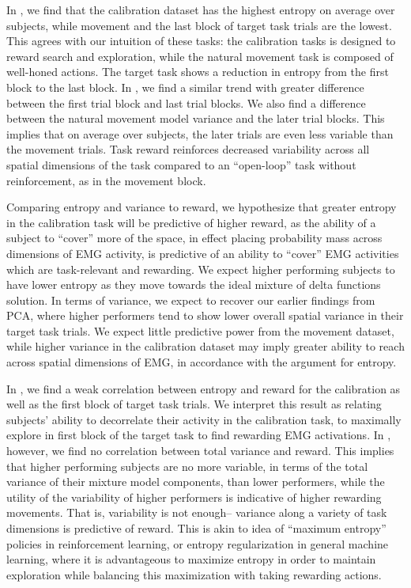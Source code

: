 \documentclass[../main.tex]{subfiles}
\begin{document}
In , we find that the calibration dataset has the highest entropy on average over subjects, while movement and the last block of target task trials are the lowest. This agrees with our intuition of these tasks: the calibration tasks is designed to reward search and exploration, while the natural movement task is composed of well-honed actions. The target task shows a reduction in entropy from the first block to the last block. In , we find a similar trend with greater difference between the first trial block and last trial blocks. We also find a difference between the natural movement model variance and the later trial blocks. This implies that on average over subjects, the later trials are even less variable than the movement trials. Task reward reinforces decreased variability across all spatial dimensions of the task compared to an ``open-loop'' task without reinforcement, as in the movement block.

Comparing entropy and variance to reward, we hypothesize that greater entropy in the calibration task will be predictive of higher reward, as the ability of a subject to ``cover'' more of the space, in effect placing probability mass across dimensions of EMG activity, is predictive of an ability to ``cover'' EMG activities which are task-relevant and rewarding. We expect higher performing subjects to have lower entropy as they move towards the ideal mixture of delta functions solution. In terms of variance, we expect to recover our earlier findings from PCA, where higher performers tend to show lower overall spatial variance in their target task trials. We expect little predictive power from the movement dataset, while higher variance in the calibration dataset may imply greater ability to reach across spatial dimensions of EMG, in accordance with the argument for entropy.

In , we find a weak correlation between entropy and reward for the calibration as well as the first block of target task trials. We interpret this result as relating subjects' ability to decorrelate their activity in the calibration task, to maximally explore in first block of the target task to find rewarding EMG activations. In , however, we find no correlation between total variance and reward. This implies that higher performing subjects are no more variable, in terms of the total variance of their mixture model components, than lower performers, while the utility of the variability of higher performers is indicative of higher rewarding movements. That is, variability is not enough-- variance along a variety of task dimensions is predictive of reward. This is akin to idea of ``maximum entropy'' policies in reinforcement learning, or entropy regularization in general machine learning, where it is advantageous to maximize entropy in order to maintain exploration while balancing this maximization with taking rewarding actions.
\end{document}
